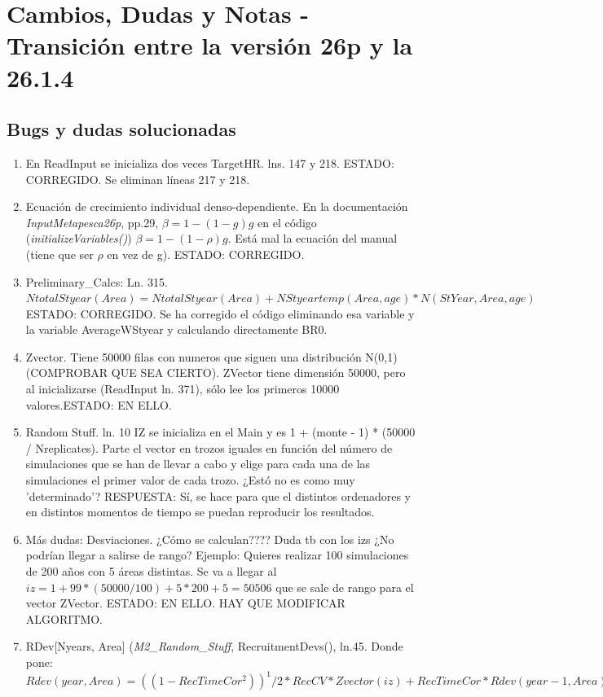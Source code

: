 \documentclass[12pt, oneside, a4paper]{article}
\begin{document}
	\section{Cambios, Dudas y Notas - Transición entre la versión 26p y la 26.1.4}
		
		\subsection{Bugs y dudas solucionadas}
	
			\begin{enumerate}
				\item En ReadInput se inicializa dos veces TargetHR.  lns. 147 y 218. ESTADO: CORREGIDO. Se eliminan líneas 217 y 218. 
				\item Ecuación de crecimiento individual denso-dependiente. En la documentación \emph{InputMetapesca26p}, pp.29, $\beta=1-(1-g)g$ en el código (\emph{initializeVariables()}) $\beta=1-(1-\rho)g$. Está mal la ecuación del manual (tiene que ser $\rho$ en vez de g). ESTADO: CORREGIDO.
				\item Preliminary\_Calcs: Ln. 315. $NtotalStyear(Area) = NtotalStyear(Area) + NStyeartemp(Area, age) * N(StYear, Area, age)$ ESTADO: CORREGIDO. Se ha corregido el código eliminando esa variable y la variable AverageWStyear y calculando directamente BR0.
				\item Zvector. Tiene 50000 filas con numeros que siguen una distribución N(0,1) (COMPROBAR QUE SEA CIERTO). ZVector tiene dimensión 50000, pero al inicializarse (ReadInput ln. 371), sólo lee los primeros 10000 valores.ESTADO: EN ELLO. 
				\item Random Stuff. ln. 10 IZ se inicializa en el Main y es 1 + (monte - 1) * (50000 / Nreplicates). Parte el vector en trozos iguales en función del número de simulaciones que se han de llevar a cabo y elige para cada una de las simulaciones el primer valor de cada trozo. ¿Estó no es como muy 'determinado'? RESPUESTA: Sí, se hace para que el distintos ordenadores y en distintos momentos de tiempo se puedan reproducir los resultados. 
				\item Más dudas: Desviaciones. ¿Cómo se calculan???? Duda tb con los izs ¿No podrían llegar a salirse de rango? Ejemplo: Quieres realizar 100 simulaciones de 200 años con 5 áreas distintas. Se va a llegar al $iz= 1+ 99*(50000/100)+ 5*200 + 5 = 50506$ que se sale de rango para el vector ZVector. ESTADO: EN ELLO. HAY QUE MODIFICAR ALGORITMO. 
				\item RDev[Nyears, Area] (\emph{M2\_Random\_Stuff}, RecruitmentDevs(), ln.45. Donde pone: $Rdev(year, Area) = ((1 - RecTimeCor ^ 2)) ^ 1/2 * RecCV * Zvector(iz) + RecTimeCor * Rdev(year - 1, Area)$

\end{enumerate}
\end{document}

